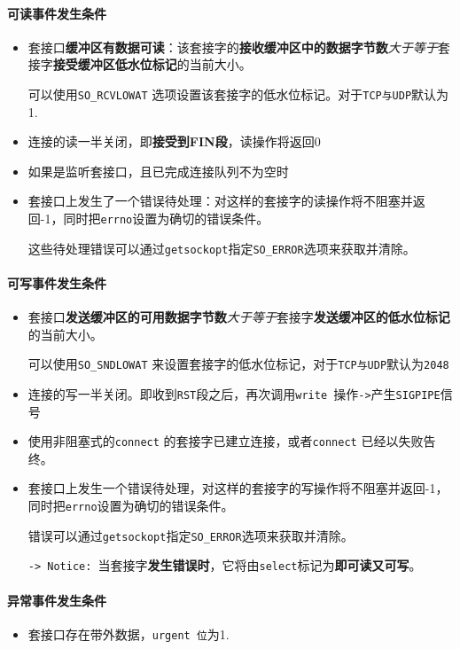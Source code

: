 \documentclass[UTF8,a4paper,8pt]{ctexbook}
\begin{document}
			\paragraph{可读事件发生条件}
				\begin{itemize}
					\item 套接口\textbf{缓冲区有数据可读}：该套接字的\textbf{接收缓冲区中的数据字节数}\textit{大于等于}套接字\textbf{接受缓冲区低水位标记}的当前大小。
					
						可以使用\verb|SO_RCVLOWAT| 选项设置该套接字的低水位标记。对于\verb|TCP与UDP|默认为1.
					\item 连接的读一半关闭，即\textbf{接受到FIN段}，读操作将返回0
					\item 如果是监听套接口，且已完成连接队列不为空时
					\item 套接口上发生了一个错误待处理：对这样的套接字的读操作将不阻塞并返回-1，同时把\verb|errno|设置为确切的错误条件。
					
					这些待处理错误可以通过\verb|getsockopt|指定\verb|SO_ERROR|选项来获取并清除。
				\end{itemize}
			\paragraph{可写事件发生条件}
				\begin{itemize}
					\item 套接口\textbf{发送缓冲区的可用数据字节数}\textit{大于等于}套接字\textbf{发送缓冲区的低水位标记}的当前大小。
					
						可以使用\verb|SO_SNDLOWAT| 来设置套接字的低水位标记，对于\verb|TCP与UDP|默认为\verb|2048|
					\item 连接的写一半关闭。即收到\verb|RST|段之后，再次调用\verb|write |操作\verb|->|产生\verb|SIGPIPE|信号
					\item 使用非阻塞式的\verb|connect| 的套接字已建立连接，或者\verb|connect| 已经以失败告终。
					
					\item 套接口上发生一个错误待处理，对这样的套接字的写操作将不阻塞并返回-1，同时把\verb|errno|设置为确切的错误条件。
					
					错误可以通过\verb|getsockopt|指定\verb|SO_ERROR|选项来获取并清除。
					
					\verb|-> Notice: |当套接字\textbf{发生错误时}，它将由\verb|select|标记为\textbf{即可读又可写}。
				\end{itemize}
			\paragraph{异常事件发生条件}
				\begin{itemize}
					\item 套接口存在带外数据，\verb|urgent 位|为1.
				\end{itemize}
			
\end{document}
